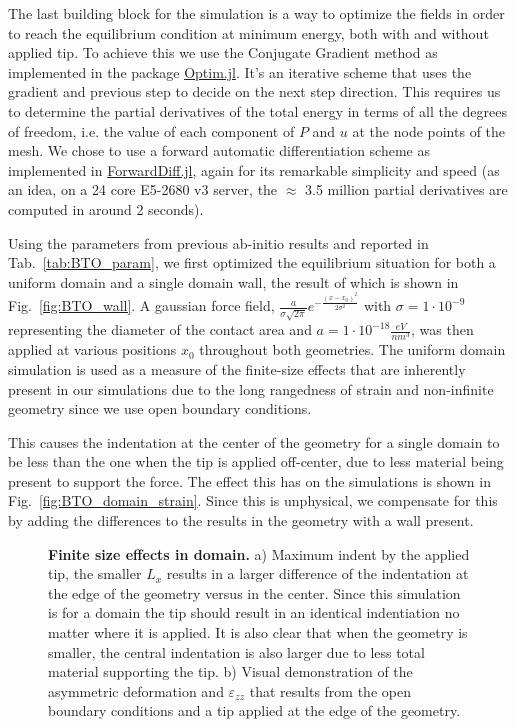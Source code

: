 The last building block for the simulation is a way to optimize the fields in order to reach the equilibrium condition at minimum energy, both with and without applied tip.
To achieve this we use the Conjugate Gradient method \cite{Hestenes1952,Hager2005} as implemented in the package \href{https://github.com/JuliaNLSolvers/Optim.jl}{Optim.jl}.
It's an iterative scheme that uses the gradient and previous step to decide on the next step direction. 
This requires us to determine the partial derivatives of the total energy in terms of all the degrees of freedom, i.e. the value of each component of $P$ and $u$ at the node points of the mesh.
We chose to use a forward automatic differentiation scheme as implemented in \href{www.juliadiff.org/ForwardDiff.jl/latest/}{ForwardDiff.jl}, again for its remarkable simplicity and speed (as an idea, on a 24 core E5-2680 v3 server, the $\approx$ 3.5 million partial derivatives are computed in around 2 seconds).

Using the parameters from previous ab-initio results \cite{Marton2010} and reported in Tab.~\ref{tab:BTO_param}, we first optimized the equilibrium situation for both a uniform domain and a single domain wall, the result of which is shown in Fig.~\ref{fig:BTO_wall}.
A gaussian force field, $\frac{a}{\sigma \sqrt{2\pi}}e^{-\frac{(x-x_0)^2}{2\sigma^2}}$ with $\sigma = 1 \cdot 10^{-9}$ representing the diameter of the contact area and $a = 1 \cdot 10^{-18} \frac{eV}{nm^3}$, was then applied at various positions $x_0$ throughout both geometries.
The uniform domain simulation is used as a measure of the finite-size effects that are inherently present in our simulations due to the long rangedness of strain and non-infinite geometry since we use open boundary conditions.

This causes the indentation at the center of the geometry for a single domain to be less than the one when the tip is applied off-center, due to less material being present to support the force.
The effect this has on the simulations is shown in Fig.~\ref{fig:BTO_domain_strain}.
Since this is unphysical, we compensate for this by adding the differences to the results in the geometry with a wall present.

\begin{figure}
	\caption{\label{fig:fig:BTO_domain_strain}{\bf Finite size effects in domain.} a) Maximum indent by the applied tip, the smaller $L_x$ results in a larger difference of the indentation at the edge of the  geometry versus in the center. Since this simulation is for a domain the tip should result in an identical indentiation no matter where it is applied. It is also clear that when the geometry is smaller, the central indentation is also larger due to less total material supporting the tip. b) Visual demonstration of the asymmetric deformation and $\varepsilon_{zz}$ that results from the open boundary conditions and a tip applied at the edge of the geometry.}
\end{figure}

